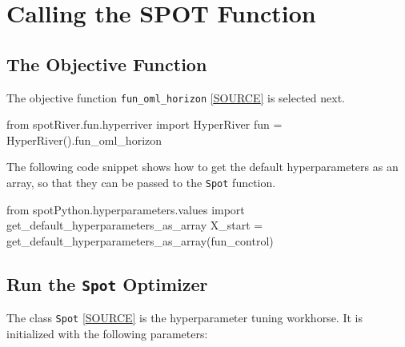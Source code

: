 \documentclass[
  letterpaper,
  DIV=11,
  numbers=noendperiod]{scrreprt}
\newenvironment{Shaded}{\begin{snugshade}}{\end{snugshade}}
\newcommand{\ImportTok}[1]{\textcolor[rgb]{0.00,0.46,0.62}{#1}}
\newcommand{\NormalTok}[1]{\textcolor[rgb]{0.00,0.23,0.31}{#1}}
\newcommand{\OperatorTok}[1]{\textcolor[rgb]{0.37,0.37,0.37}{#1}}
\begin{document}
\section{Calling the SPOT Function}\label{calling-the-spot-function-1}

\subsection{The Objective Function}\label{sec-the-objective-function-51}

The objective function \texttt{fun\_oml\_horizon}
\href{https://github.com/sequential-parameter-optimization/spotRiver/blob/main/src/spotRiver/fun/hyperriver.py}{{[}SOURCE{]}}
is selected next.

\begin{Shaded}
\begin{Highlighting}[]
\ImportTok{from}\NormalTok{ spotRiver.fun.hyperriver }\ImportTok{import}\NormalTok{ HyperRiver}
\NormalTok{fun }\OperatorTok{=}\NormalTok{ HyperRiver().fun\_oml\_horizon}
\end{Highlighting}
\end{Shaded}

The following code snippet shows how to get the default hyperparameters
as an array, so that they can be passed to the \texttt{Spot} function.

\begin{Shaded}
\begin{Highlighting}[]
\ImportTok{from}\NormalTok{ spotPython.hyperparameters.values }\ImportTok{import}\NormalTok{ get\_default\_hyperparameters\_as\_array}
\NormalTok{X\_start }\OperatorTok{=}\NormalTok{ get\_default\_hyperparameters\_as\_array(fun\_control)}
\end{Highlighting}
\end{Shaded}

\subsection{\texorpdfstring{Run the \texttt{Spot}
Optimizer}{Run the Spot Optimizer}}\label{run-the-spot-optimizer-1}

The class \texttt{Spot}
\href{https://github.com/sequential-parameter-optimization/spotPython/blob/main/src/spotPython/spot/spot.py}{{[}SOURCE{]}}
is the hyperparameter tuning workhorse. It is initialized with the
following parameters:
\end{document}
